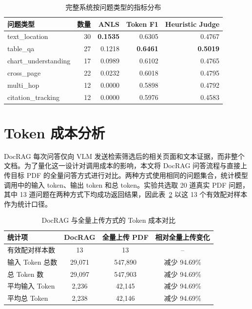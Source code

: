 \begin{table}[htbp]
\centering
\caption{完整系统按问题类型的指标分布}
\label{tab:by-type}
\begin{tabular}{@{}lrrrr@{}}
\toprule
\textbf{问题类型} & \textbf{数量} & \textbf{ANLS} & \textbf{Token F1} & \textbf{Heuristic Judge} \\
\midrule
text\_location & 30 & \textbf{0.1535} & 0.6305 & 0.4767 \\
table\_qa & 27 & 0.1218 & \textbf{0.6461} & \textbf{0.5019} \\
chart\_understanding & 17 & 0.0989 & 0.6102 & 0.4765 \\
cross\_page & 22 & 0.0232 & 0.6018 & 0.4795 \\
multi\_hop & 12 & 0.0000 & 0.5898 & 0.4792 \\
citation\_tracking & 12 & 0.0000 & 0.5976 & 0.4583 \\
\bottomrule
\end{tabular}
\end{table}

\section{Token 成本分析}\label{sec:exp-token}

DocRAG 每次问答仅向 VLM 发送检索筛选后的相关页面和文本证据，而非整个文档。为了量化这一设计对调用成本的影响，本文将 DocRAG 问答流程与直接上传目标 PDF 的全量问答方式进行对比。两种方式使用相同的问题集合，统计模型调用中的输入 token、输出 token 和总 token。实验共选取 20 道真实 PDF 问题，其中 13 道问题在两种方式下均成功返回结果，因此表~\ref{tab:token-cost} 以这 13 个有效配对样本作为统计口径。

\begin{table}[htbp]
\centering
\caption{DocRAG 与全量上传方式的 Token 成本对比}
\label{tab:token-cost}
\begin{tabular}{lccc}
\toprule
统计项 & DocRAG & 全量上传 PDF & 相对全量上传变化 \\
\midrule
有效配对样本数 & 13 & 13 & -- \\
输入 Token 总数 & 29,071 & 547,890 & 减少 94.69\% \\
总 Token 数 & 29,097 & 547,903 & 减少 94.69\% \\
平均输入 Token & 2,236 & 42,145 & 减少 94.69\% \\
平均总 Token & 2,238 & 42,146 & 减少 94.69\% \\
\bottomrule
\end{tabular}
\end{table}


